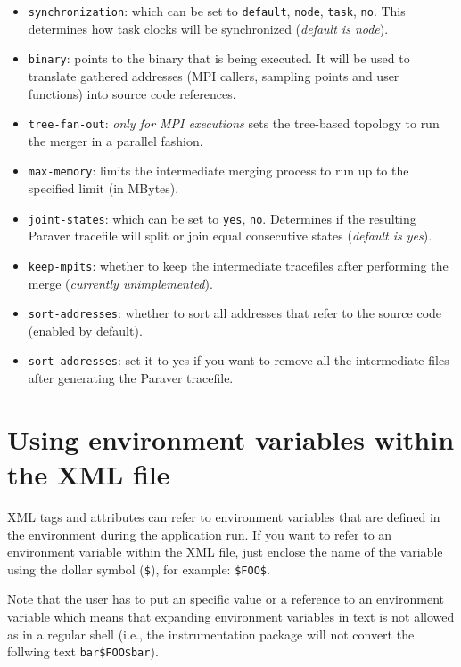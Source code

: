 \begin{itemize}
 \item {\tt synchronization}: which can be set to {\tt default}, {\tt node}, {\tt task}, {\tt no}. This determines how task clocks will be synchronized ({\em default is node}).
 \item {\tt binary}: points to the binary that is being executed. It will be used to translate gathered addresses (MPI callers, sampling points and user functions) into source code references.
 \item {\tt tree-fan-out}: {\em only for MPI executions} sets the tree-based topology to run the merger in a parallel fashion.
 \item {\tt max-memory}: limits the intermediate merging process to run up to the specified limit (in MBytes).
 \item {\tt joint-states}: which can be set to {\tt yes}, {\tt no}. Determines if the resulting Paraver tracefile will split or join equal consecutive states ({\em default is yes}).
 \item {\tt keep-mpits}: whether to keep the intermediate tracefiles after performing the merge ({\em currently unimplemented}).
 \item {\tt sort-addresses}: whether to sort all addresses that refer to the source code (enabled by default).
 \item {\tt sort-addresses}: set it to yes if you want to remove all the intermediate files after generating the Paraver tracefile.
\end{itemize}


\section{Using environment variables within the XML file}\label{sec:EnvVars_in_XML}

XML tags and attributes can refer to environment variables that are defined in the environment during the application run. If you want to refer to an environment variable within the XML file, just enclose the name of the variable using the dollar symbol ({\tt \$}), for example: {\tt \$FOO\$}.

Note that the user has to put an specific value or a reference to an environment variable which means that expanding environment variables in text is not allowed as in a regular shell (i.e., the instrumentation package will not convert the follwing text {\tt bar\$FOO\$bar}).

